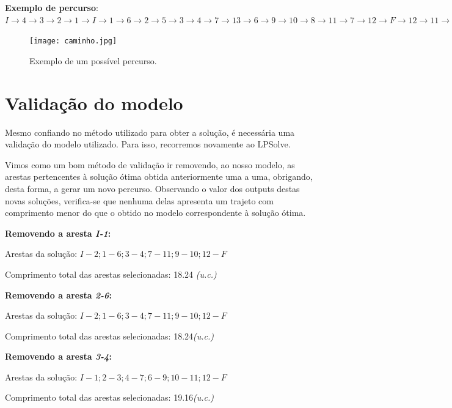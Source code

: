 \documentclass[runningheads]{llncs}
\begin{document}
    \newpage


    \clearpage

    \textbf{Exemplo de percurso}:
    \newline $I \rightarrow 4 \rightarrow 3 \rightarrow 2 \rightarrow 1 \rightarrow I \rightarrow 1 \rightarrow 6 \rightarrow 2 \rightarrow 5 \rightarrow 3 \rightarrow 4 \rightarrow 7 \rightarrow 13 \rightarrow 6 \rightarrow 9 \rightarrow 10 \rightarrow 8 \rightarrow 11 \rightarrow 7 \rightarrow 12 \rightarrow F \rightarrow 12 \rightarrow 11 \rightarrow 10 \rightarrow 9 \rightarrow F$

    \begin{figure}[h]
        \centering
        \texttt{[image: caminho.jpg]}
        \caption{Exemplo de um possível percurso.}
        \label{fig:data9}
    \end{figure}

    \clearpage

    \section{Validação do modelo}
    Mesmo confiando no método utilizado para obter a solução, é necessária uma validação do modelo utilizado. Para isso, recorremos novamente ao LPSolve.

    Vimos como um bom método de validação ir removendo, ao nosso modelo, as arestas pertencentes à solução ótima obtida anteriormente uma a uma, obrigando, desta forma, a gerar um novo percurso. Observando o valor dos outputs destas novas soluções, verifica-se que nenhuma delas apresenta um trajeto com comprimento menor do que o obtido no modelo correspondente à solução ótima.

    \bigskip
    \textbf{Removendo a aresta \textit{I-1}:}

    Arestas da solução: $I-2; 1-6; 3-4; 7-11; 9-10; 12-F$

    Comprimento total das arestas selecionadas: 18.24 \textit{(u.c.)}

    \bigskip
    \textbf{Removendo a aresta \textit{2-6}:}

    Arestas da solução: $I-2; 1-6; 3-4; 7-11; 9-10; 12-F$

    Comprimento total das arestas selecionadas: 18.24\textit{(u.c.)}

    \bigskip
    \textbf{Removendo a aresta \textit{3-4}:}

    Arestas da solução: $I-1; 2-3; 4-7; 6-9; 10-11; 12-F$

    Comprimento total das arestas selecionadas: 19.16\textit{(u.c.)}
\end{document}
